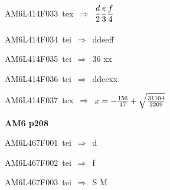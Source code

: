 {\sixrm AM6L414F033\ {\sixit tex}\ }$\Rightarrow$\ ${\displaystyle\strut d\over \displaystyle\strut 2} {\displaystyle\strut e\over \displaystyle\strut 3} {\displaystyle\strut f\over \displaystyle\strut 4}$\par\smallskip
{\sixrm AM6L414F034\ {\sixit tei}\ }$\Rightarrow$\ {\tenit ddeeff}\par\smallskip
{\sixrm AM6L414F035\ {\sixit tei}\ }$\Rightarrow$\ 36 {\tenit xx}\par\smallskip
{\sixrm AM6L414F036\ {\sixit tei}\ }$\Rightarrow$\ {\tenit ddeexx}\par\smallskip
{\sixrm AM6L414F037\ {\sixit tex}\ }$\Rightarrow$\ $x = - {{156\over 47}} + \sqrt{{31104\over 2209}}$\par\smallskip

\par\vfill\eject
{\bf\hfill AM6 p208\hfill\hbox{}}\par\bigskip
{\sixrm AM6L467F001\ {\sixit tei}\ }$\Rightarrow$\ {\tenit d}\par\smallskip
{\sixrm AM6L467F002\ {\sixit tei}\ }$\Rightarrow$\ {\tenit f}\par\smallskip
{\sixrm AM6L467F003\ {\sixit tei}\ }$\Rightarrow$\ {\tenit S} {\tenit M}\par\smallskip

